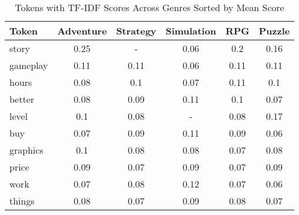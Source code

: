 \begin{table}[h]
    \centering
    \begin{tabular}{l|c|c|c|c|c}
        Token & Adventure & Strategy & Simulation & RPG & Puzzle \\
        \hline
        story & 0.25 & - & 0.06 & 0.2 & 0.16 \\
        gameplay & 0.11 & 0.11 & 0.06 & 0.11 & 0.11 \\
        hours & 0.08 & 0.1 & 0.07 & 0.11 & 0.1 \\
        better & 0.08 & 0.09 & 0.11 & 0.1 & 0.07 \\
        level & 0.1 & 0.08 & - & 0.08 & 0.17 \\
        buy & 0.07 & 0.09 & 0.11 & 0.09 & 0.06 \\
        graphics & 0.1 & 0.08 & 0.08 & 0.07 & 0.08 \\
        price & 0.09 & 0.07 & 0.09 & 0.07 & 0.09 \\
        work & 0.07 & 0.08 & 0.12 & 0.07 & 0.06 \\
        things & 0.08 & 0.07 & 0.09 & 0.08 & 0.07
    \end{tabular}
    \caption{Tokens with TF-IDF Scores Across Genres Sorted by Mean Score}
    \label{tab:prominent_tokens}
\end{table}